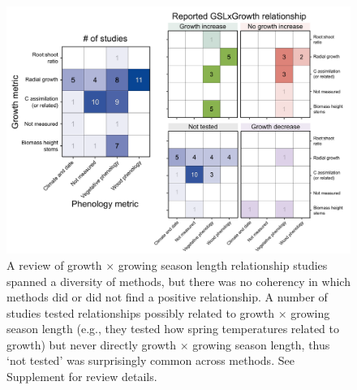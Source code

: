 \documentclass[11pt]{article}
\begin{document}
\clearpage
\begin{figure}[h!]
\includegraphics[width=1\textwidth]{..//figures/_figuresFromRuben/heatmap.png} %
\caption{A review of growth $\times$ growing season length relationship studies spanned a diversity of methods, but there was no coherency in which methods did or did not find a positive relationship. A number of studies tested relationships possibly related to growth $\times$ growing season length (e.g., they tested how spring temperatures related to growth) but never directly growth $\times$ growing season length, thus `not tested' was surprisingly common across methods. See Supplement for review details.}
\label{fig:heatmaps}
\end{figure}

\end{document}
